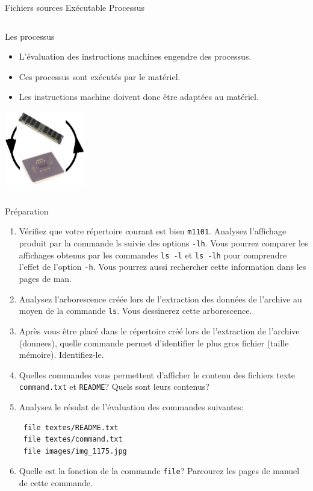 \begin{frame}{Fichiers sources \textrightarrow Exécutable
    \textrightarrow Processus}
\begin{columns}
\begin{column}{3.8cm}
      \begin{block}{Les processus}
        \begin{itemize}
        \item L'évaluation des instructions machines engendre des
          processus.
        \item Ces processus sont exécutés par le matériel.
        \item Les instructions machine doivent donc être adaptées au
          matériel.
        \end{itemize}
      \end{block}
      \includegraphics[width=3.5cm]{img/s03/fichier_1_5.jpg}
    \end{column}
  \end{columns}
\end{frame}
\begin{exercice}
  \begin{exercicelet}{Préparation}
    \begin{enumerate}\setcounter{enumi}{\value{cnti}}
    \item Vérifiez que votre répertoire courant est bien
      \verb|m1101|. Analysez l'affichage produit par la commande ls
      suivie des options \texttt{-lh}. Vous pourrez comparer les
      affichages obtenus par les commandes \texttt{ls -l} et \texttt{ls
        -lh} pour comprendre l'effet de l'option \texttt{-h}. Vous
      pourrez aussi rechercher cette information dans les pages de man.
    \item Analysez l'arborescence créée lors de l'extraction des données
      de l'archive au moyen de la commande \texttt{ls}. Vous dessinerez
      cette arborescence.
    \item Après vous être placé dans le répertoire créé lors de
      l'extraction de l'archive (donnees), quelle commande permet
      d'identifier le plus gros fichier (taille mémoire). Identifiez-le.
    \item Quelles commandes vous permettent d'afficher le contenu des
      fichiers texte \verb|command.txt| et \texttt{README}? Quels
      sont leurs contenus?
    \item Analysez le résulat de l'évaluation des commandes suivantes:
\begin{verbatim}
 file textes/README.txt
 file textes/command.txt
 file images/img_1175.jpg
\end{verbatim}
    \item Quelle est la fonction de la commande \texttt{file}? Parcourez
      les pages de manuel de cette commande.
      \setcounter{cnti}{\value{enumi}}
    \end{enumerate}
  \end{exercicelet}
\end{exercice}

